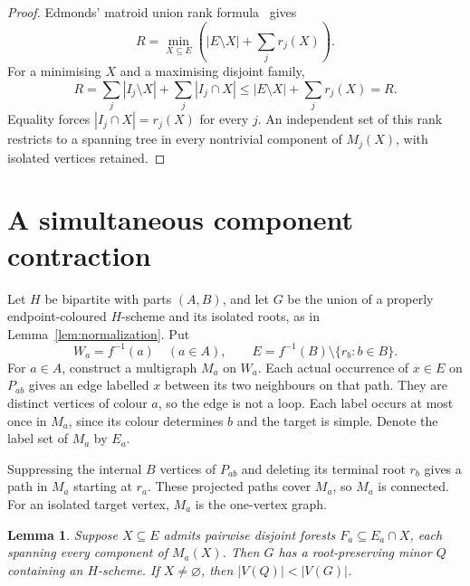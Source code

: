 \documentclass[11pt]{amsart}
\newtheorem{lemma}[theorem]{Lemma}
\begin{document}
\begin{proof}
Edmonds' matroid union rank formula~\cite[Theorem 1 and the following
discussion, pp.~202--203]{Edmonds} gives
\[
 R=\min_{X\subseteq E}\left(|E\setminus X|+\sum_jr_j(X)\right).
\]
For a minimising $X$ and a maximising disjoint family,
\[
 R=\sum_j|I_j\setminus X|+\sum_j|I_j\cap X|
 \leq |E\setminus X|+\sum_jr_j(X)=R.
\]
Equality forces $|I_j\cap X|=r_j(X)$ for every $j$. An independent
set of this rank restricts to a spanning tree in every nontrivial
component of $M_j(X)$, with isolated vertices retained.
\end{proof}

\section{A simultaneous component contraction}

Let $H$ be bipartite with parts $(A,B)$, and let $G$ be the union of a
properly endpoint-coloured $H$-scheme and its isolated roots, as in
Lemma~\ref{lem:normalization}. Put
\[
 W_a=f^{-1}(a)\quad(a\in A),\qquad
 E=f^{-1}(B)\setminus\{r_b:b\in B\}.
\]
For $a\in A$, construct a multigraph $M_a$ on $W_a$. Each actual
occurrence of $x\in E$ on $P_{ab}$ gives an edge labelled $x$ between
its two neighbours on that path. They are distinct vertices of colour
$a$, so the edge is not a loop. Each label occurs at most once in
$M_a$, since its colour determines $b$ and the target is simple.
Denote the label set of $M_a$ by $E_a$.

Suppressing the internal $B$ vertices of $P_{ab}$ and deleting its
terminal root $r_b$ gives a path in $M_a$ starting at $r_a$. These
projected paths cover $M_a$, so $M_a$ is connected. For an isolated target
vertex, $M_a$ is the one-vertex graph.

\begin{lemma}\label{lem:reduction}
Suppose $X\subseteq E$ admits pairwise disjoint forests
$F_a\subseteq E_a\cap X$, each spanning every component of $M_a(X)$.
Then $G$ has a root-preserving minor $Q$ containing an $H$-scheme.
If $X\ne\varnothing$, then $|V(Q)|<|V(G)|$.
\end{lemma}
\end{document}

